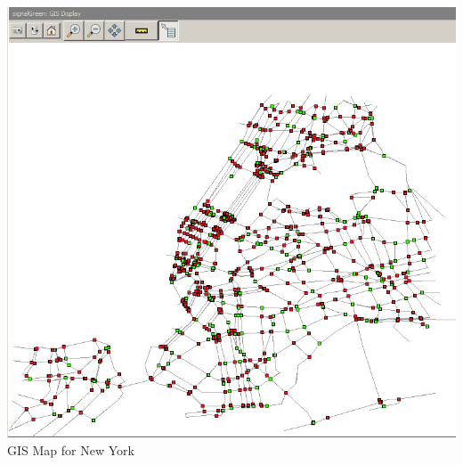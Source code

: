 \documentclass[11pt]{article}
\begin{document}
\begin{enumerate}
\begin{itemize}
\begin{table}[H]
\begin{center}
\includegraphics[scale=0.4]{nyc_full}\hfill \\
GIS Map for New York
\end{center}
\end{table}
\end{itemize}%



\end{enumerate}
\end{document}
